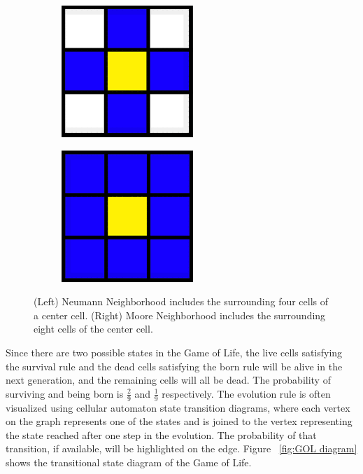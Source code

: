 \documentclass[12pt]{article}
\numberwithin{figure}{section} %
\begin{document}
\begin{figure}[H]
   \begin{subfigure}{0.48\textwidth}
     \centering
     \includegraphics[width=.6\linewidth]{Section1/1}
   \end{subfigure}\hfill
   \begin{subfigure}{0.48\textwidth}
     \centering
     \includegraphics[width=.6\linewidth]{Section1/2}
   \end{subfigure}
   \caption{(Left) Neumann Neighborhood includes the surrounding four cells of a center cell. (Right) Moore Neighborhood includes the surrounding eight cells of the center cell.}
   \vspace{-1.5em}
   \label{fig:Neighborhood}
\end{figure}

Since there are two possible states in the Game of Life, the live cells satisfying the survival rule and the dead cells satisfying the born rule will be alive in the next generation, and the remaining cells will all be dead. The probability of surviving and being born is $\frac{2}{9}$ and $\frac{1}{9}$ respectively. The evolution rule is often visualized using cellular automaton state transition diagrams, where each vertex on the graph represents one of the states and is joined to the vertex representing the state reached after one step in the evolution. The probability of that transition, if available, will be highlighted on the edge. Figure ~\ref{fig:GOL diagram} shows the transitional state diagram of the Game of Life. 
\end{document}
